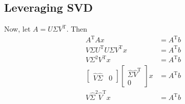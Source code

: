 \documentclass{article}
\begin{document}
\subsection{Leveraging SVD}
Now, let $A = U \Sigma V^\mathrm{T}$. Then
\begin{align*}
    A^\mathrm{T} A x &= A^\mathrm{T} b \\
    V \Sigma U^\mathrm{T} U \Sigma V^\mathrm{T} x &= A^\mathrm{T} b \\
    V \Sigma^2 V^\mathrm{T} x &= A^\mathrm{T} b \\
    \begin{bmatrix}
        \hat{V} \hat{\Sigma} & 0
    \end{bmatrix} \begin{bmatrix}
        \hat{\Sigma} \hat{V}^\mathrm{T} \\
        0
    \end{bmatrix} x &= A^\mathrm{T} b \\
    \hat{V} \hat{\Sigma}^2 \hat{V}^\mathrm{T} x &= A^\mathrm{T} b
\end{align*}
\end{document}
